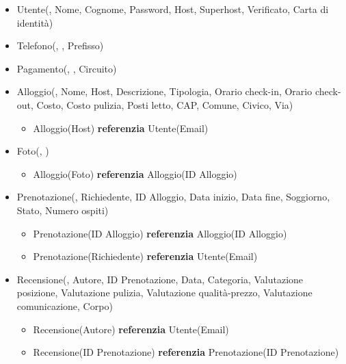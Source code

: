\begin{itemize}
      \item Utente(, Nome, Cognome, Password, Host, Superhost, Verificato, Carta di identità)
      \item Telefono(, , Prefisso)
      \item Pagamento(, , Circuito)
      \item Alloggio(, Nome, Host, Descrizione, Tipologia, Orario check-in, Orario check-out, Costo, Costo pulizia, Posti letto, CAP, Comune, Civico, Via)
            \begin{itemize}[noitemsep]
                  \item Alloggio(Host) \textbf{referenzia} Utente(Email)
            \end{itemize}
      \item Foto(, )
            \begin{itemize}[noitemsep]
                  \item Alloggio(Foto) \textbf{referenzia} Alloggio(ID Alloggio)
            \end{itemize}
      \item Prenotazione(, Richiedente, ID Alloggio, Data inizio, Data fine, Soggiorno, Stato, Numero ospiti)
            \begin{itemize}[noitemsep]
                  \item Prenotazione(ID Alloggio) \textbf{referenzia} Alloggio(ID Alloggio)
                  \item Prenotazione(Richiedente) \textbf{referenzia} Utente(Email)
            \end{itemize}
      \item Recensione(, Autore, ID Prenotazione, Data, Categoria, Valutazione posizione, Valutazione pulizia, Valutazione qualità-prezzo, Valutazione comunicazione, Corpo)
            \begin{itemize}[noitemsep]
                  \item Recensione(Autore) \textbf{referenzia} Utente(Email)
                  \item Recensione(ID Prenotazione) \textbf{referenzia} Prenotazione(ID Prenotazione)
            \end{itemize}

\end{itemize}
